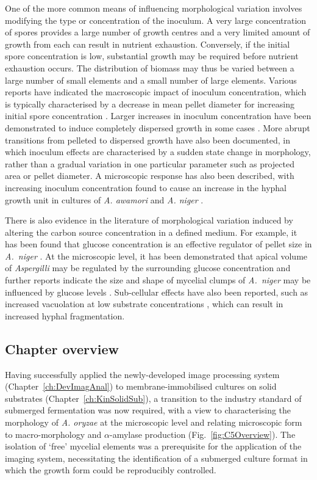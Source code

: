 One of the more common means of influencing morphological variation involves modifying the type or concentration of the inoculum. A very large concentration of spores provides a large number of growth centres and a very limited amount of growth from each can result in nutrient exhaustion. Conversely, if the initial spore concentration is low, substantial growth may be required before nutrient exhaustion occurs. The distribution of biomass may thus be varied between a large number of small elements and a small number of large elements. Various reports have indicated the macroscopic impact of inoculum concentration, which is typically characterised by a decrease in mean pellet diameter for increasing initial spore concentration \cite{xu2000}. Larger increases in inoculum concentration have been demonstrated to induce completely dispersed growth in some cases \cite{papagianni2006a}. More abrupt transitions from pelleted to dispersed growth \cite{tucker1992a,jhkim2000,papagianni2006a,teng2009} have also been documented, in which inoculum effects are characterised by a sudden state change in morphology, rather than a gradual variation in one particular parameter such as projected area or pellet diameter. A microscopic response has also been described, with increasing inoculum concentration found to cause an increase in the hyphal growth unit in cultures of \emph{A. awamori} \cite{johansen1998} and \emph{A. niger} \cite{papagianni2006b}.

There is also evidence in the literature of morphological variation induced by altering the carbon source concentration in a defined medium. For example, it has been found that glucose concentration is an effective regulator of pellet size in \emph{A.~niger} \cite{papagianni2004}. At the microscopic level, it has been demonstrated that apical volume of \emph{Aspergilli} may be regulated by the surrounding glucose concentration \cite{muller2000} and further reports indicate the size and shape of mycelial clumps of \emph{A.~niger} may be influenced by glucose levels \cite{papagianni1999a}. Sub-cellular effects have also been reported, such as increased vacuolation at low substrate concentrations \cite{righelato1968,papagianni1999}, which can result in increased hyphal fragmentation.

\subsection{Chapter overview}

Having successfully applied the newly-developed image processing system (Chapter~\ref{ch:DevImagAnal}) to membrane-immobilised cultures on solid substrates (Chapter~\ref{ch:KinSolidSub}), a transition to the industry standard of submerged fermentation was now required, with a view to characterising the morphology of \emph{A. oryzae} at the microscopic level and relating microscopic form to macro-morphology and $\alpha$-amylase production (Fig.~\ref{fig:C5Overview}). The isolation of \lq free' mycelial elements was a prerequisite for the application of the imaging system, necessitating the identification of a submerged culture format in which the growth form could be reproducibly controlled.

